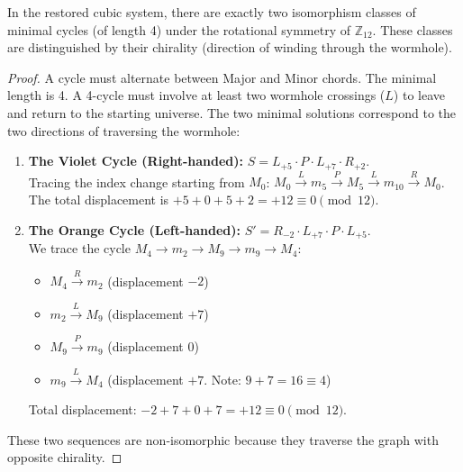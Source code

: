 \documentclass[10pt,a4paper]{amsart}
\begin{document}
\begin{theorem}
In the restored cubic system, there are exactly two isomorphism classes of minimal cycles (of length 4) under the rotational symmetry of \texorpdfstring{$\mathbb{Z}_{12}$}{Z12}. These classes are distinguished by their chirality (direction of winding through the wormhole).
\end{theorem}

\begin{proof}
A cycle must alternate between Major and Minor chords. The minimal length is 4. A 4-cycle must involve at least two wormhole crossings (\texorpdfstring{$L$}{L}) to leave and return to the starting universe.
The two minimal solutions correspond to the two directions of traversing the wormhole:

\begin{enumerate}
    \item \textbf{The Violet Cycle (Right-handed):} $ S = L_{+5} \cdot P \cdot L_{+7} \cdot R_{+2} $.\\
    Tracing the index change starting from $M_0$: 
    $M_0 \xrightarrow{L} m_5 \xrightarrow{P} M_5 \xrightarrow{L} m_{10} \xrightarrow{R} M_0$.
    The total displacement is $+5 + 0 + 5 + 2 = +12 \equiv 0 \pmod{12}$.
    
    \item \textbf{The Orange Cycle (Left-handed):} $ S' = R_{-2} \cdot L_{+7} \cdot P \cdot L_{+5} $. \\
    We trace the cycle $M_4 \to m_2 \to M_9 \to m_9 \to M_4$:
    \begin{itemize}
        \item $M_4 \xrightarrow{R} m_2$ (displacement $-2$)
        \item $m_2 \xrightarrow{L} M_9$ (displacement $+7$)
        \item $M_9 \xrightarrow{P} m_9$ (displacement $0$)
        \item $m_9 \xrightarrow{L} M_4$ (displacement $+7$. Note: $9+7=16 \equiv 4$)
    \end{itemize}
    Total displacement: $-2 + 7 + 0 + 7 = +12 \equiv 0 \pmod{12}$.
\end{enumerate}
These two sequences are non-isomorphic because they traverse the graph with opposite chirality.
\end{proof}
\end{document}
